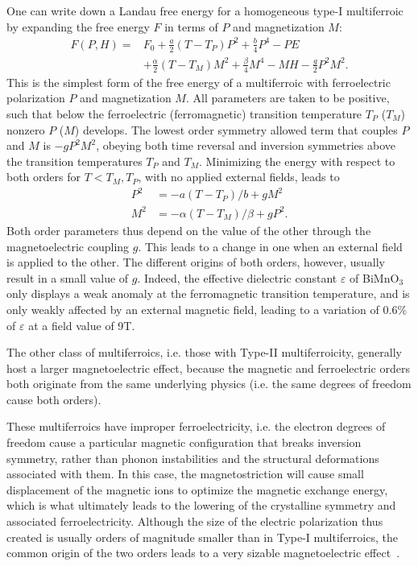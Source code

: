 One can write down a Landau free energy for a homogeneous type-I multiferroic by expanding the free energy $F$ in terms of $P$ and magnetization $M$:
\begin{align}
	F(P, H) =& F_0 + \frac{a}{2} (T-T_P) P^2 + \frac{b}{4} P^4 - P E \\
	&+\frac{\alpha}{2} (T-T_M)M^2 + \frac{\beta}{4} M^4 - MH - \frac{g}{2}P^2 M^2.
\end{align}
This is the simplest form of the free energy of a multiferroic with ferroelectric polarization $P$ and magnetization $M$. All parameters are taken to be positive, such that below the ferroelectric (ferromagnetic) transition temperature $T_P$ ($T_M$) nonzero $P$ ($M$) develops.
The lowest order symmetry allowed term that couples $P$ and $M$ is $-gP^2M^2$, obeying both time reversal and inversion symmetries above the transition temperatures $T_P$ and $T_M$.
Minimizing the energy with respect to both orders for $T<T_M,T_P$, with no applied external fields, leads to
\begin{align}
	P^2 &= - a(T-T_P)/b + gM^2\\
	M^2 &= - \alpha(T-T_M)/\beta + gP^2.
\end{align}
Both order parameters thus depend on the value of the other through the magnetoelectric coupling $g$. This leads to a change in one when an external field is applied to the other.
The different origins of both orders, however, usually result in a small value of $g$. Indeed, the effective dielectric constant $\varepsilon$ of BiMnO$_3$ only displays a weak anomaly at the ferromagnetic transition temperature, and is only weakly affected by an external magnetic field, leading to a variation of 0.6\% of $\varepsilon$ at a field value of 9T.

The other class of multiferroics, i.e. those with Type-II multiferroicity, generally host a larger magnetoelectric effect, because the magnetic and ferroelectric orders both originate from the same underlying physics (i.e. the same degrees of freedom cause both orders).

These multiferroics have improper ferroelectricity, i.e. the electron degrees of freedom cause a particular magnetic configuration that breaks inversion symmetry, rather than phonon instabilities and the structural deformations associated with them.
In this case, the magnetostriction will cause small displacement of the magnetic ions to optimize the magnetic exchange energy, which is what ultimately leads to the lowering of the crystalline symmetry and associated ferroelectricity.  
Although the size of the electric polarization thus created is usually orders of magnitude smaller than in Type-I multiferroics, the common origin of the two orders leads to a very sizable magnetoelectric effect~\cite{Oh2014}.

